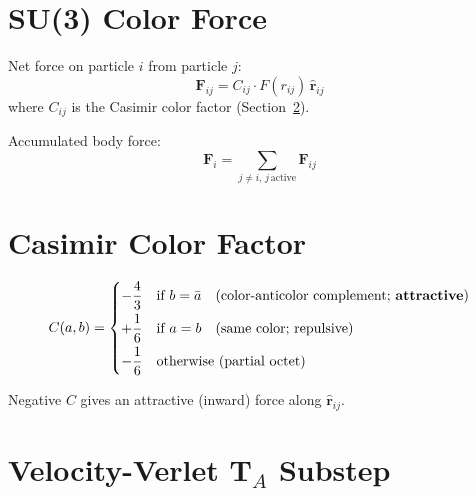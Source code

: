 \documentclass[10pt, a4paper, oneside]{article}
\begin{document}
\section{SU(3) Color Force}

Net force on particle $i$ from particle $j$:
\begin{equation}
  \mathbf{F}_{ij} = C_{ij} \cdot F(r_{ij})\,\hat{\mathbf{r}}_{ij}
\end{equation}
where $C_{ij}$ is the Casimir color factor (Section~\ref{sec:casimir}).

Accumulated body force:
\begin{equation}
  \mathbf{F}_i = \sum_{j \neq i,\,j\,\mathrm{active}} \mathbf{F}_{ij}
\end{equation}

\section{Casimir Color Factor}
\label{sec:casimir}

\begin{equation}
  C(a,b) =
  \begin{cases}
    -\dfrac{4}{3} & \text{if } b = \bar{a} \quad \text{(color-anticolor complement; \textbf{attractive})} \\[6pt]
    +\dfrac{1}{6} & \text{if } a = b \quad \text{(same color; repulsive)} \\[6pt]
    -\dfrac{1}{6} & \text{otherwise (partial octet)}
  \end{cases}
\end{equation}

\noindent Negative $C$ gives an attractive (inward) force along $\hat{\mathbf{r}}_{ij}$.

\section{Velocity-Verlet T\texorpdfstring{$_A$}{A} Substep}
\end{document}
